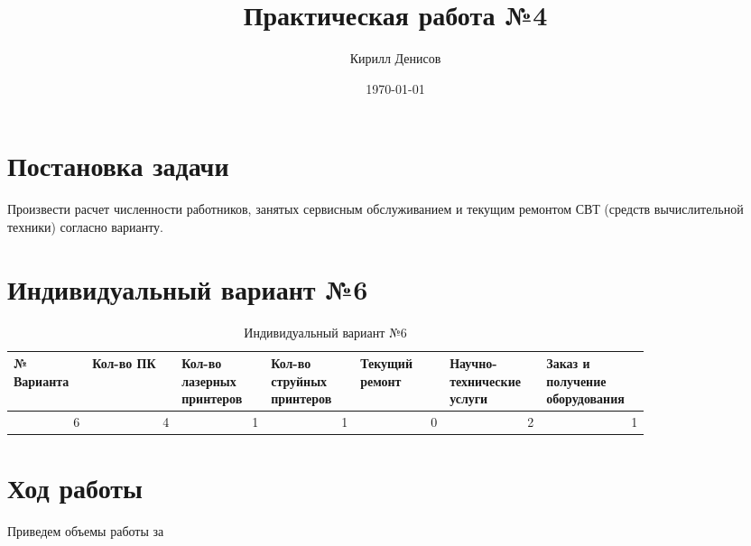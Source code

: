 \documentclass[a4paper,14pt]{extarticle}
\author{Кирилл Денисов}
\title{Практическая работа №4}
\date{\today}
\newcommand{\pathToCommonFolder}{/home/denilai/Documents/repos/latex/Common}
\begin{document}
	\thispagestyle{empty}
	
	\newpage
	\newpage
	
	
	
	
\section{Постановка задачи}

Произвести расчет численности работников, занятых
сервисным обслуживанием и текущим
ремонтом СВТ (средств вычислительной
техники) согласно варианту.




\section{Индивидуальный вариант №6}

\begin{table}[htbp]
	
	\small
	\begin{tabular}{|p{0.1\linewidth}|p{0.12\linewidth}|p{0.12\linewidth}|p{0.12\linewidth}|p{0.12\linewidth}|p{0.12\linewidth}|p{0.12\linewidth}|}
		\hline
		№
		Варианта & Кол-во
		ПК & Кол-во
		лазерных
		принтеров & Кол-во
		струйных
		принтеров & Текущий ремонт & Научно-технические услуги & Заказ и получение оборудования \\ \hline
		\multicolumn{1}{|r|}{6} & \multicolumn{1}{r|}{4} & \multicolumn{1}{r|}{1} & \multicolumn{1}{r|}{1} & \multicolumn{1}{r|}{0} & \multicolumn{1}{r|}{2} & \multicolumn{1}{r|}{1} \\ \hline
	\end{tabular}
    \caption{Индивидуальный вариант №6}
	\label{}
\end{table}


\section*{Ход работы}

Приведем объемы работы за 
\end{document}
